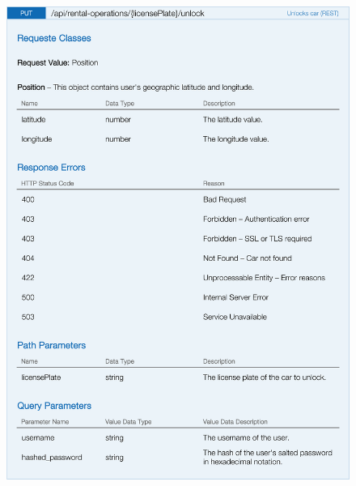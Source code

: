 \begin{figure}[H]
	\noindent
    	\centering
    	\includegraphics{apitables/APIUnlockCar.png}
    	\label{fig:api-unlock-car}
\end{figure}

